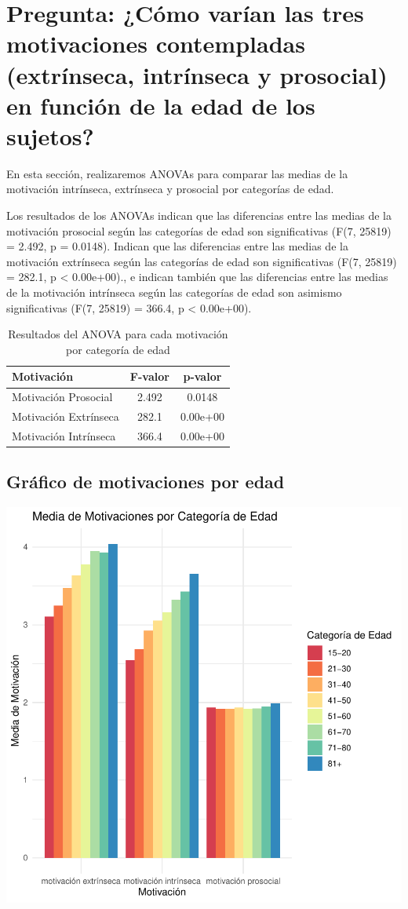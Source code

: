 \documentclass{article}
\begin{document}
\section{Pregunta: ¿Cómo varían las tres motivaciones contempladas (extrínseca, intrínseca y prosocial) en función de la edad de los sujetos?}

En esta sección, realizaremos ANOVAs para comparar las medias de la motivación intrínseca, extrínseca y prosocial por categorías de edad.


Los resultados de los ANOVAs indican que las diferencias entre las medias de la motivación prosocial según las categorías de edad son significativas (F(7, 25819) = 2.492, p = 0.0148). Indican que las diferencias entre las medias de la motivación extrínseca según las categorías de edad son significativas (F(7, 25819) = 282.1, p < 0.00e+00)., e indican también que las diferencias entre las medias de la motivación intrínseca según las categorías de edad son asimismo significativas (F(7, 25819) = 366.4, p < 0.00e+00).

\begin{table}[h!]
\centering
\caption{Resultados del ANOVA para cada motivación por categoría de edad}
\begin{tabular}{lcc}
  \toprule
  \textbf{Motivación} & \textbf{F-valor} & \textbf{p-valor} \\
  \midrule
  Motivación Prosocial & 2.492 & 0.0148 \\
  Motivación Extrínseca & 282.1 & 0.00e+00 \\
  Motivación Intrínseca & 366.4 & 0.00e+00 \\
  \bottomrule
\end{tabular}
\end{table}


\subsection{Gráfico de motivaciones por edad}
\includegraphics{Ejemplo-006}
\end{document}

